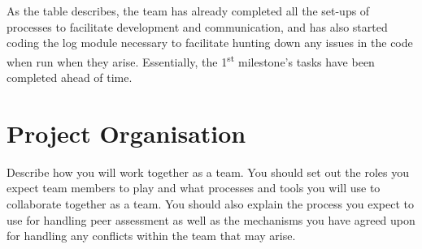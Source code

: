 As the table describes, the team has already completed all the set-ups of processes to facilitate development and communication, and has also started coding the log module necessary to facilitate hunting down any issues in the code when run when they arise. Essentially, the 1\textsuperscript{st} milestone's tasks have been completed ahead of time.

\section{Project Organisation} %
Describe how you will work together as a team. You should set out the roles you expect team members to play and what
processes and tools you will use to collaborate together as a team. You should also explain the process you expect to
use for handling peer assessment as well as the mechanisms you have agreed upon for handling any conflicts within the
team that may arise.

